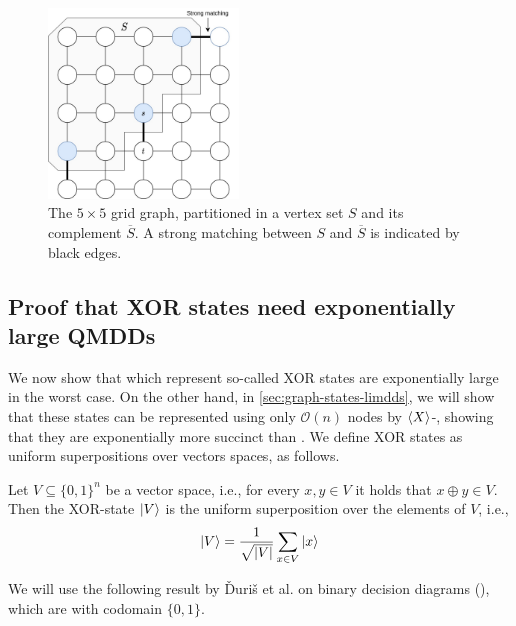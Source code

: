 \begin{figure}[h!]
\centering
\includegraphics[width=0.45\textwidth]{pics/strong-matching-in-grid.jpg}
\caption{
    The $5\times 5$ grid graph, partitioned in a vertex set $S$ and its complement $\overline{S}$.
    A strong matching between $S$ and $\overline{S}$ is indicated by black edges.
}
\label{fig:strong-matching-in-grid}
\end{figure}



\subsection{Proof that XOR states need exponentially large QMDDs}

We now show that \qmdds which represent so-called XOR states are exponentially large in the worst case.
On the other hand, in \autoref{sec:graph-states-limdds}, we will show that these states can be represented using only $\mathcal O(n)$ nodes by $\braket{X}$-\limdds, showing that they are exponentially more succinct than \qmdds.
We define XOR states as uniform superpositions over vectors spaces, as follows.

\begin{definition}
	\label{def:xor-states}
	Let $V\subseteq\{0,1\}^n$ be a vector space, i.e., for every $x,y\in V$ it holds that $x\oplus y\in V$.
	Then the XOR-state $\ket{V}$ is the uniform superposition over the elements of $V$, i.e.,
	\begin{align}
	\ket{V}=\frac{1}{\sqrt{|V|}}\sum_{x\in V}\ket x
	\end{align}
\end{definition}

We will use the following result by \v{D}uri\v{s} et al. on binary decision diagrams (\bdds), which are \adds with codomain $\{0, 1\}$.

